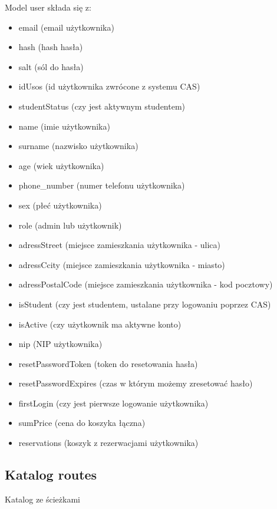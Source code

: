 \documentclass[titlepage]{article}
\begin{document}
Model user składa się z:
\begin{itemize}
  \item email (email użytkownika)
  \item hash (hash hasła)
  \item salt (sól do hasła)
  \item idUsos (id użytkownika zwrócone z systemu CAS)
  \item studentStatus (czy jest aktywnym studentem)
  \item name (imie użytkownika)
  \item surname (nazwisko użytkownika)
  \item age (wiek użytkownika)
  \item phone\_number (numer telefonu użytkownika)
  \item sex (płeć użytkownika)
  \item role (admin lub użytkownik)
  \item adressStreet (miejsce zamieszkania użytkownika - ulica)
  \item adressCcity (miejsce zamieszkania użytkownika - miasto)
  \item adressPostalCode (miejsce zamieszkania użytkownika - kod pocztowy)
  \item isStudent (czy jest studentem, ustalane przy logowaniu poprzez CAS)
  \item isActive (czy użytkownik ma aktywne konto)
  \item nip (NIP użytkownika)
  \item resetPasswordToken (token do resetowania hasła)
  \item resetPasswordExpires (czas w którym możemy zresetować hasło)
  \item firstLogin (czy jest pierwsze logowanie użytkownika)
  \item sumPrice (cena do koszyka łączna)
  \item reservations (koszyk z rezerwacjami użytkownika)
  
\end{itemize}

\newpage
\subsection{Katalog routes}
Katalog ze ścieżkami
\end{document}
